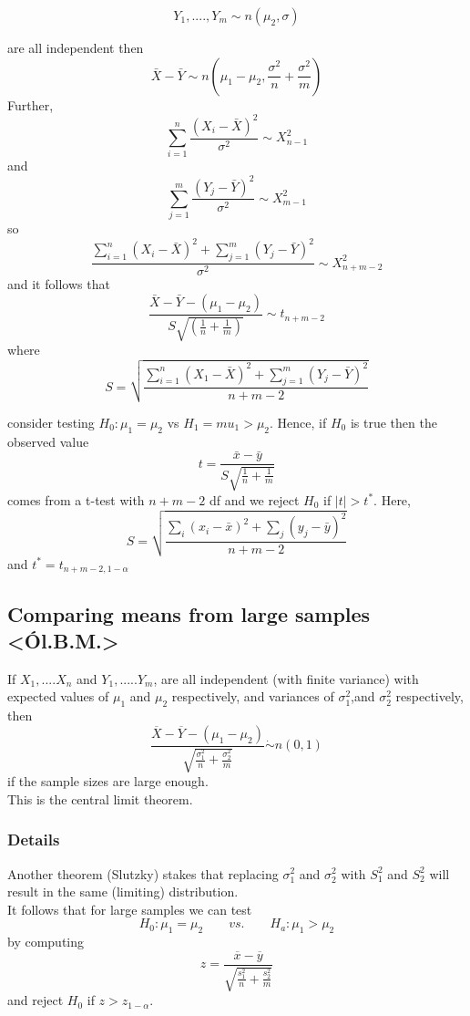 \documentclass[12pt,a4paper]{article}
\theoremstyle{regla}
\theoremstyle{remark}
\theoremstyle{definition}
\theoremstyle{nonumberbreak}
\begin{document}
$$Y_1, ...., Y_m \sim n(\mu_2,\sigma)$$

 
are all independent then
$$\bar{X}-\bar{Y} \sim n(\mu_1-\mu_2,\frac{\sigma^2}{n}+\frac{\sigma^2}{m})$$
Further,
$$\sum_{i=1}^{n} \frac{(X_i-\bar{X})^2}{\sigma^2} \sim X_{n-1}^{2}$$
and
$$\sum_{j=1}^{m} \frac{(Y_j-\bar{Y})^2}{\sigma^2} \sim X_{m-1}^{2}$$
so
$$\frac {\sum_{i=1}^{n}(X_i-\bar{X})^2 + \sum_{j=1}^{m}(Y_j-\bar{Y})^2}{\sigma^2} \sim X_{n+m-2}^2$$
and it follows that
$$\frac {\bar{X}-\bar{Y}-(\mu_1-\mu_2)}{S\sqrt{(\frac{1}{n}+\frac{1}{m})}} \sim t_{n+m-2}$$
where
$$S=\sqrt{\frac{\sum_{i=1}^{n}(X_1-\bar{X})^2+\sum_{j=1}^{m}(Y_j-\bar{Y})^2}{n+m-2}}$$

consider testing $H_0:\mu_1=\mu_2$ vs $H_1=mu_1>\mu_2$. Hence, if $H_0$ is true then the observed value
$$t=\frac{\bar{x}-\bar{y}}{S\sqrt{\frac{1}{n}+\frac{1}{m}}}$$
comes from a t-test with $n+m-2$ df and we reject $H_0$ if $\left|t\right|>t^\ast$. Here,
$$S=\sqrt{\frac{\sum_{i}(x_i-\bar{x})^2+\sum_{j}(y_j-\bar{y})^2}{n+m-2}}$$
and $t^\ast=t_{n+m-2,1-\alpha}$


\subsection{Comparing means from large samples <Ól.B.M.>}
\begin{fbox}
\begin{minipage}{0.97\textwidth}
If $X_1,....X_n$ and $Y_1,.....Y_m$, are all independent (with finite variance) with expected values of $\mu_1$ and $\mu_2$ respectively, and variances of $\sigma_1^2$,and $\sigma_2^2$ respectively, then 
$$\frac{\overline{X}-\overline{Y}-(\mu_1-\mu_2)}{\sqrt{\frac{\sigma_1^2}{n}+\frac{\sigma_2^2}{m}}} \dot{\sim}n(0,1)$$
if the sample sizes are large enough.\\

This is the central limit theorem.
\end{minipage}
\end{fbox}
\subsubsection{Details}
Another theorem (Slutzky) stakes that replacing $\sigma_1^2$ and $\sigma_2^2$ with $S_1^2$ and $S_2^2$ will result in the same (limiting) distribution.\\

It follows that for large samples we can test
$$H_0: \mu_1=\mu_2 \qquad vs. \qquad H_a:\mu_1 > \mu_2$$
by computing $$z=\frac{\overline{x}-\overline{y}}{\sqrt{\frac{s_1^2}{n}+\frac{s_2^2}{m}}}$$
and reject $H_0$ if $z>z_{1-\alpha}$.
\end{document}
